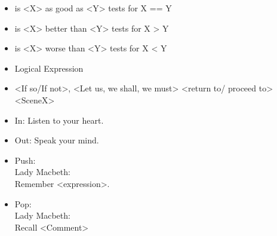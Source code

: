 \documentclass[a0paper,fontscale=0.285]{baposter} %
\newcommand{\compresslist}{ %
\setlength{\itemsep}{1pt}
\setlength{\parskip}{0pt}
\setlength{\parsep}{0pt}
}
\begin{document}
\begin{poster}
{ \colorbox[HTML]{CCFFFF}{}
\begin{itemize}\compresslist
 \item is <X> as good as <Y> tests for X == Y
 \item is <X> better than <Y> tests for X > Y
 \item is <X> worse than <Y> tests for X < Y
 \end{itemize}

\colorbox[HTML]{CCFFFF}{}
\begin{itemize}\compresslist
 \item Logical Expression
 \item <If so/If not>, <Let us, we shall, we must> <return to/ proceed to> <SceneX>
 \end{itemize}

\colorbox[HTML]{CCFFFF}{}
\begin{itemize}\compresslist
 \item In: Listen to your heart.
 \item Out: Speak your mind.
 \end{itemize}

\colorbox[HTML]{CCFFFF}{}
\begin{itemize}\compresslist
 \item Push: \\Lady Macbeth:\\
 Remember <expression>.
 \item Pop: \\Lady Macbeth:\\
 Recall <Comment>
 \end{itemize}


}


\end{poster}
\end{document}
